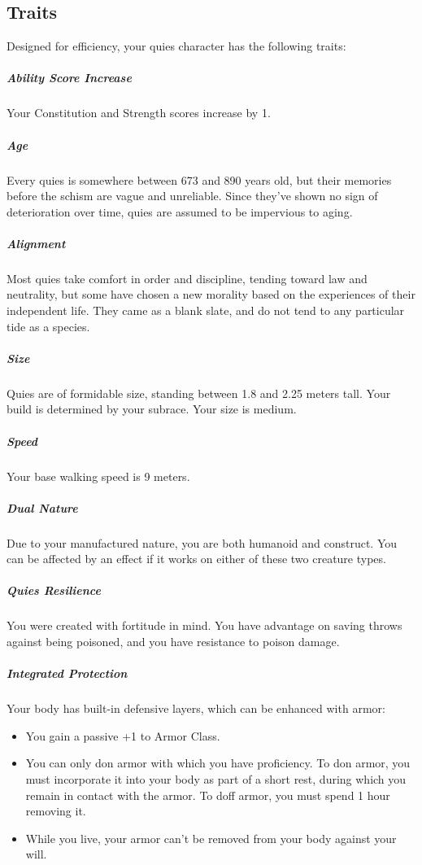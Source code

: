 \subsection*{Traits}
    Designed for efficiency, your quies character has the following traits:

    \subparagraph{Ability Score Increase} Your Constitution and Strength scores increase by 1.

    \subparagraph{Age} Every quies is somewhere between 673 and 890 years old, but their memories before the schism are vague and unreliable.
    Since they've shown no sign of deterioration over time, quies are assumed to be impervious to aging.

    \subparagraph{Alignment} Most quies take comfort in order and discipline, tending toward law and neutrality, but some have chosen a new morality based on the experiences of their independent life.
    They came as a blank slate, and do not tend to any particular tide as a species.

    \subparagraph{Size} Quies are of formidable size, standing between 1.8 and 2.25 meters tall.
    Your build is determined by your subrace.
    Your size is medium.

    \subparagraph{Speed} Your base walking speed is 9 meters.

    \subparagraph{Dual Nature} Due to your manufactured nature, you are both humanoid and construct.
    You can be affected by an effect if it works on either of these two creature types.

    \subparagraph{Quies Resilience} You were created with fortitude in mind.
    You have advantage on saving throws against being poisoned, and you have resistance to poison damage.

    \subparagraph{Integrated Protection} Your body has built-in defensive layers, which can be enhanced with armor:

    \begin{itemize}
        \item You gain a passive +1 to Armor Class.
        \item You can only don armor with which you have proficiency.
        To don armor, you must incorporate it into your body as part of a short rest, during which you remain in contact with the armor.
        To doff armor, you must spend 1 hour removing it.
        \item While you live, your armor can't be removed from your body against your will.
    \end{itemize}

